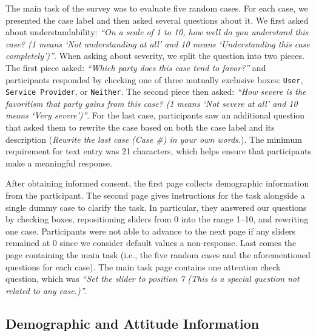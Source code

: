 
The main task of the survey was to evaluate five random cases.
For each case, we presented the case label and then asked several questions about it.
We first asked about understandability: \textit{``On a scale of 1 to 10, how well do you understand this case? (1 means `Not understanding at all' and 10 means `Understanding this case completely')''}.
When asking about severity, we split the question into two pieces.
The first piece asked: \textit{``Which party does this case tend to favor?''} and participants responded by checking one of three mutually exclusive boxes: \texttt{User}, \texttt{Service Provider}, or \texttt{Neither}.
The second piece then asked: \textit{``How severe is the favoritism that party gains from this case?
(1 means `Not severe at all' and 10 means `Very severe')''}.
For the last case, participants saw an additional question that asked them to rewrite the case based on both the case label and its description (\textit{Rewrite the last case (Case \#) in your own words.}).
The minimum requirement for text entry was 21 characters, which helps ensure that participants make a meaningful response.


After obtaining informed consent, the first page collects demographic information from the participant.
The second page gives instructions for the task alongside a single dummy case to clarify the task.
In particular, they answered our questions by checking boxes, repositioning sliders from 0 into the range 1--10, and rewriting one case.
Participants were not able to advance to the next page if any sliders remained at 0 since we consider default values a non-response.
Last comes the page containing the main task (i.e., the five random cases and the aforementioned questions for each case).
The main task page contains one attention check question, which was \textit{``Set the slider to position 7 (This is a special question not related to any case.)''}.

\subsection{Demographic and Attitude Information}

